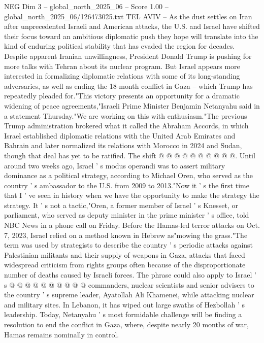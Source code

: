\begin{textsample}{NEG Dim 3 – global\_north\_2025\_06 – Score 1.00 – global\_north\_2025\_06/126473025.txt}  \label{ex:f3_neg_365}
TEL AVIV -- As the dust settles on Iran after unprecedented Israeli and American attacks, the U.S. and Israel have shifted their focus toward an ambitious diplomatic push they hope will translate into the kind of enduring political stability that has evaded the region for decades.
Despite apparent Iranian unwillingness, President Donald Trump is pushing for more talks with Tehran about its nuclear program.
But Israel appears more interested in formalizing diplomatic relations with some of its long-standing adversaries, as well as ending the 18-month conflict in Gaza -- which Trump has repeatedly pleaded for."This victory presents an opportunity for a dramatic widening of peace agreements,"Israeli Prime Minister Benjamin Netanyahu said in a statement Thursday."We are working on this with enthusiasm."The previous Trump administration brokered what it called the Abraham Accords, in which Israel established diplomatic relations with the United Arab Emirates and Bahrain and later normalized its relations with Morocco in 2024 and Sudan, though that deal has yet to be ratified.
The shift @ @ @ @ @ @ @ @ @ @.
Until around two weeks ago, Israel ' s modus operandi was to assert military dominance as a political strategy, according to Michael Oren, who served as the country ' s ambassador to the U.S. from 2009 to 2013."Now it ' s the first time that I ' ve seen in history when we have the opportunity to make the strategy the strategy.
It ' s not a tactic,"Oren, a former member of Israel ' s Knesset, or parliament, who served as deputy minister in the prime minister ' s office, told NBC News in a phone call on Friday.
Before the Hamas-led terror attacks on Oct. 7, 2023, Israel relied on a method known in Hebrew as"mowing the grass."The term was used by strategists to describe the country ' s periodic attacks against Palestinian militants and their supply of weapons in Gaza, attacks that faced widespread criticism from rights groups often because of the disproportionate number of deaths caused by Israeli forces.
The phrase could also apply to Israel ' s @ @ @ @ @ @ @ @ @ @ commanders, nuclear scientists and senior advisers to the country ' s supreme leader, Ayatollah Ali Khamenei, while attacking nuclear and military sites.
In Lebanon, it has wiped out large swaths of Hezbollah ' s leadership.
Today, Netanyahu ' s most formidable challenge will be finding a resolution to end the conflict in Gaza, where, despite nearly 20 months of war, Hamas remains nominally in control.

\end{textsample}
